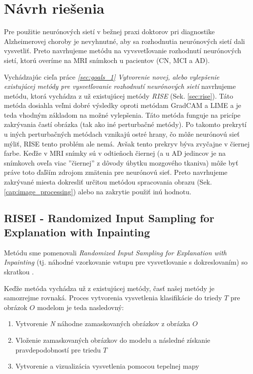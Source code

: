 \chapter{Návrh riešenia}

Pre použitie neurónových sietí v bežnej praxi doktorov pri diagnostike Alzheimerovej choroby je nevyhnutné, aby sa rozhodnutia neurónových sietí dali vysvetliť. Preto navrhujeme metódu na vyvsvetľovanie rozhodnutí neurónových sietí, ktorú overíme na MRI snímkoch u pacientov (CN, MCI a AD).

Vychádzajúc cieľa práce \textit{\ref{sec:goals_1} Vytvorenie novej, alebo vylepšenie existujúcej metódy pre vysvetľovanie rozhodnutí neurónových sietí} navrhujeme metódu, ktorá vychádza z už existujúcej metódy \textit{RISE} (Sek. \ref{sec:rise}). Táto metóda dosiahla veľmi dobré výsledky oproti metódam GradCAM a LIME a je teda vhodným základom na možné vylepšenia. Táto metóda funguje na pricípe zakrývania častí obrázka (tak ako iné perturbačné metódy). Po takomto prekrytí u iných perturbačných metódach vznikajú ostré hrany, čo môže neurónovú sieť mýliť, RISE tento problém ale nemá. Avšak tento prekryv býva zvyčajne v čiernej farbe. Keďže v MRI snímky sú v odtieňoch čiernej (a u AD jedincov je na snímkovch oveľa viac ''čiernej'' z dôvody úbytku mozgového tkaniva) môže byť práve toto ďaľším zdrojom zmätenia pre neurónovú sieť. Preto navrhujeme zakrývané miesta dokresliť určitou metódou spracovania obrazu (Sek. \ref{cap:image_processing}) alebo na zakrytie použiť inú hodnotu.

\section{RISEI - Randomized Input Sampling for Explanation with Inpainting}

Metódu sme pomenovali \textit{Randomized Input Sampling for Explanation with Inpainting} (tj. náhodné vzorkovanie vstupu pre vysvetlovanie s dokreslovaním) so skratkou .

Keďže metóda vychádza už z existujúcej metódy, časť našej metódy je samozrejme rovnaká. Proces vytvorenia vysvetlenia klasifikácie do triedy $T$ pre obrázok $O$ modelom je teda nasledovný:

\begin{enumerate}
    \item Vytvorenie \textit{N} náhodne zamaskovaných obrázkov z obrázka $O$
    \item Vloženie zamaskovaných obrázkov do modelu a následné získanie pravdepodobností pre triedu $T$
    \item Vytvorenie a vizualizácia vysvetlenia pomocou tepelnej mapy
\end{enumerate}

